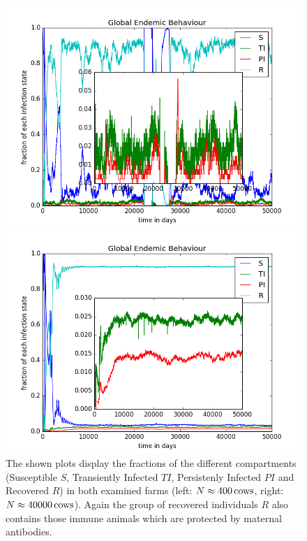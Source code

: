 \begin{figure}[htbp]
\begin{minipage}{0.5\textwidth}
\centering
\noindent\includegraphics[width=0.9\linewidth,height=\textheight,
keepaspectratio]{endemicFractions300.png} 
\end{minipage}
\begin{minipage}{0.5\textwidth}
\centering
\noindent\includegraphics[width=0.9\linewidth,height=\textheight,
keepaspectratio]{endemicFractions40000.png} 
\end{minipage}
\caption[Shares Of Compartments In Different Farm Sizes]{The shown plots display the fractions of the different compartments (Susceptible $S$, Transiently Infected $TI$, Persistenly Infected $PI$ and Recovered $R$) in both examined farms (left: $N\approx 400\,\text{cows}$, right: $N\approx 40000\,\text{cows}$). Again the group of recovered individuals $R$ also contains those immune animals which are protected by maternal antibodies.}
\label{fig:sharesCompartmentsDifferentFarmSizes}
\end{figure} 

